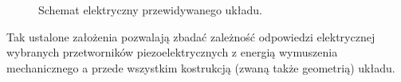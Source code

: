 \begin{figure}[htbp]
\centering
{}
\caption{Schemat elektryczny przewidywanego układu.}
\label{fig:electrical_scheme}
\end{figure}

\indent Tak ustalone założenia pozwalają zbadać zależność odpowiedzi 
elektrycznej wybranych przetworników piezoelektrycznych z energią wymuszenia mechanicznego 
a przede wszystkim kostrukcją (zwaną także geometrią) układu.